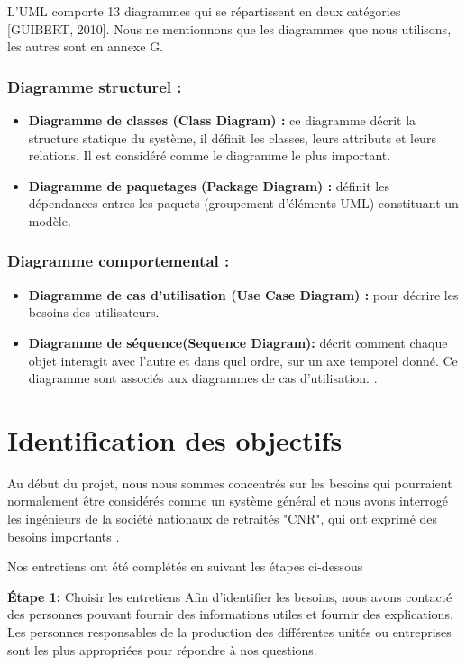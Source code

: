  L’UML comporte 13 diagrammes qui se répartissent en deux catégories [GUIBERT, 2010]. Nous ne mentionnons que les diagrammes que nous utilisons, les autres sont en annexe G. 
 
 \subsubsection{Diagramme structurel : }
 \begin{itemize}
 \item \textbf{Diagramme de classes (Class Diagram) : }ce diagramme décrit la structure statique du système, il définit les classes, leurs attributs et leurs relations. Il est considéré comme le diagramme le plus important.
  \item  \textbf{Diagramme de paquetages (Package Diagram) : }définit les dépendances entres les paquets (groupement d’éléments UML) constituant un modèle. 
 \end{itemize}
 
 
  \subsubsection{Diagramme comportemental  : }
 
  \begin{itemize}
 	\item \textbf{Diagramme de cas d’utilisation (Use Case Diagram) : } pour décrire les besoins des utilisateurs. 
 	\item  \textbf{Diagramme de séquence(Sequence Diagram):}  décrit comment chaque objet interagit avec l’autre et dans quel ordre, sur un axe temporel donné. Ce diagramme sont associés aux diagrammes de cas d’utilisation.
 	. 
 \end{itemize}



\section{Identification des objectifs}

Au début du projet, nous nous sommes concentrés sur les besoins qui pourraient normalement être considérés comme un système général et nous avons interrogé les ingénieurs de la société nationaux de retraités    "CNR", qui ont exprimé des besoins importants .
 
 
 Nos entretiens ont été complétés en suivant les étapes ci-dessous
 
\textbf{ Étape 1:} Choisir les entretiens Afin d'identifier les besoins, nous avons contacté des personnes pouvant fournir des informations utiles et fournir des explications. Les personnes responsables de la production des différentes unités ou entreprises sont les plus appropriées pour répondre à nos questions.
 
